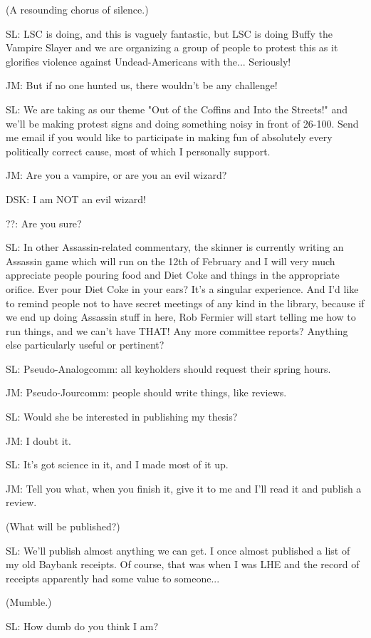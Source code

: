 \documentclass[12pt]{article}
\begin{document}
(A resounding chorus of silence.)

SL: LSC is doing, and this is vaguely fantastic, but LSC is doing Buffy the Vampire Slayer and we are organizing a group of people to protest this as it glorifies violence against Undead-Americans with the... Seriously!

JM: But if no one hunted us, there wouldn't be any challenge!

SL: We are taking as our theme "Out of the Coffins and Into the Streets!" and we'll be making protest signs and doing something noisy in front of 26-100. Send me email if you would like to participate in making fun of absolutely every politically correct cause, most of which I personally support.

JM: Are you a vampire, or are you an evil wizard?

DSK: I am NOT an evil wizard!

??: Are you sure?

SL: In other Assassin-related commentary, the skinner is currently writing an Assassin game which will run on the 12th of February and I will very much appreciate people pouring food and Diet Coke and things in the appropriate orifice. Ever pour Diet Coke in your ears? It's a singular experience. And I'd like to remind people not to have secret meetings of any kind in the library, because if we end up doing Assassin stuff in here, Rob Fermier will start telling me how to run things, and we can't have THAT! Any more committee reports? Anything else particularly useful or pertinent?

SL: Pseudo-Analogcomm: all keyholders should request their spring hours.

JM: Pseudo-Jourcomm: people should write things, like reviews.

SL: Would she be interested in publishing my thesis?

JM: I doubt it.

SL: It's got science in it, and I made most of it up.

JM: Tell you what, when you finish it, give it to me and I'll read it and publish a review.

(What will be published?)

SL: We'll publish almost anything we can get. I once almost published a list of my old Baybank receipts. Of course, that was when I was LHE and the record of receipts apparently had some value to someone...

(Mumble.)

SL: How dumb do you think I am?
\end{document}
